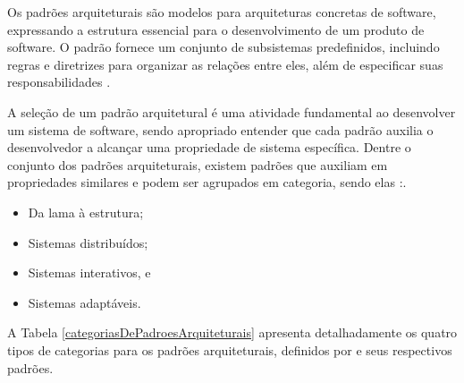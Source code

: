 Os padrões arquiteturais são modelos para arquiteturas concretas de software, expressando a estrutura essencial para o desenvolvimento de um produto de software. O padrão fornece um conjunto de subsistemas predefinidos, incluindo regras e diretrizes para organizar as relações entre eles, além de especificar suas responsabilidades \cite{buschmann1996system}. 

A seleção de um padrão arquitetural é uma atividade fundamental ao desenvolver um sistema de software, sendo apropriado entender que cada padrão auxilia o desenvolvedor a alcançar uma propriedade de sistema específica. Dentre o conjunto dos padrões arquiteturais, existem padrões que auxiliam em propriedades similares e podem ser agrupados em categoria, sendo elas \cite{buschmann1996system}:.

\begin{itemize}
	
	\item Da lama à estrutura;
	
	\item Sistemas distribuídos;
	
	\item Sistemas interativos, e
	
	\item Sistemas adaptáveis.

\end{itemize}

A Tabela \ref{categoriasDePadroesArquiteturais} apresenta detalhadamente os quatro tipos de categorias para os padrões arquiteturais, definidos por \cite{buschmann1996system} e seus respectivos padrões.

